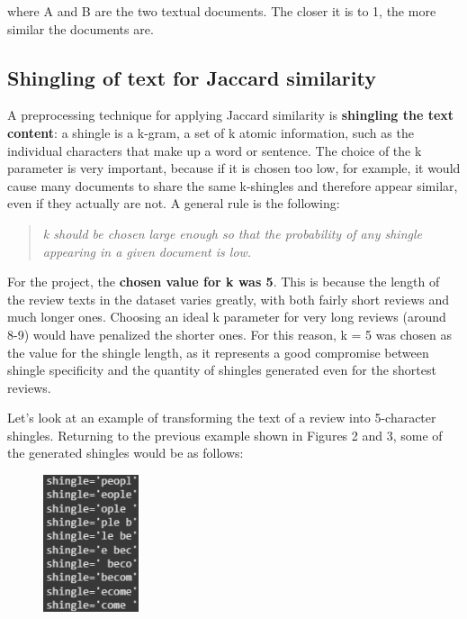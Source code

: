 \documentclass[12pt, a4paper]{article}
\begin{document}
where A and B are the two textual documents. The closer it is to 1, the more similar the documents are.

\subsection{Shingling of text for Jaccard similarity}
A preprocessing technique for applying Jaccard similarity is \textbf{shingling the text content}: a shingle is a k-gram, a set of k atomic information, such as the individual characters that make up a word or sentence. The choice of the k parameter is very important, because if it is chosen too low, for example, it would cause many documents to share the same k-shingles and therefore appear similar, even if they actually are not. A general rule is the following:
\begin{quote}
    \textit{k should be chosen large enough so that the probability of any shingle appearing in a given document is low.}
\end{quote}
For the project, the \textbf{chosen value for k was 5}. This is because the length of the review texts in the dataset varies greatly, with both fairly short reviews and much longer ones. Choosing an ideal k parameter for very long reviews (around 8-9) would have penalized the shorter ones. For this reason, k = 5 was chosen as the value for the shingle length, as it represents a good compromise between shingle specificity and the quantity of shingles generated even for the shortest reviews.

Let's look at an example of transforming the text of a review into 5-character shingles. Returning to the previous example shown in Figures 2 and 3, some of the generated shingles would be as follows:
\begin{figure}[H]
    \centering
    \includegraphics[width=0.25\textwidth]{Screenshot 2025-09-04 103955.png}
    \label{fig:placeholder}
\end{figure}
\end{document}
